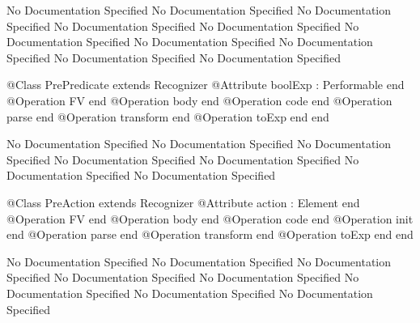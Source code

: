 No Documentation Specified
No Documentation Specified
No Documentation Specified
No Documentation Specified
No Documentation Specified
No Documentation Specified
No Documentation Specified
No Documentation Specified
No Documentation Specified
No Documentation Specified
\begin{Interface}
@Class PrePredicate extends Recognizer
  @Attribute boolExp : Performable end
  @Operation FV end
  @Operation body end
  @Operation code end
  @Operation parse end
  @Operation transform end
  @Operation toExp end
end
\end{Interface}
No Documentation Specified
No Documentation Specified
No Documentation Specified
No Documentation Specified
No Documentation Specified
No Documentation Specified
No Documentation Specified
\begin{Interface}
@Class PreAction extends Recognizer
  @Attribute action : Element end
  @Operation FV end
  @Operation body end
  @Operation code end
  @Operation init end
  @Operation parse end
  @Operation transform end
  @Operation toExp end
end
\end{Interface}
No Documentation Specified
No Documentation Specified
No Documentation Specified
No Documentation Specified
No Documentation Specified
No Documentation Specified
No Documentation Specified
No Documentation Specified
